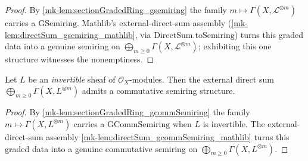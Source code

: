 \begin{proof}
  \leanok
  By \ref{mk-lem:sectionGradedRing_gsemiring} the family \(m \mapsto
  \Gamma(X,\mathcal{L}^{\otimes m})\) carries a \(\mathrm{GSemiring}\). Mathlib's
  external-direct-sum assembly (\ref{mk-lem:directSum_gsemiring_mathlib}, via
  \(\mathrm{DirectSum.toSemiring}\)) turns this graded data into a genuine semiring
  on \(\bigoplus_{m \ge 0} \Gamma(X,\mathcal{L}^{\otimes m})\); exhibiting this one
  structure witnesses the nonemptiness.
\end{proof}

\begin{lemma}\label{mk-lem:sectionGradedRing_commSemiring_nonempty}
  \leanok

  Let \(L\) be an \emph{invertible} sheaf of \(\mathcal{O}_X\)-modules. Then the
  external direct sum \(\bigoplus_{m \ge 0} \Gamma(X, L^{\otimes m})\) admits a
  commutative semiring structure.
\end{lemma}

\begin{proof}
  \leanok
  By \ref{mk-lem:sectionGradedRing_gcommSemiring} the family \(m \mapsto
  \Gamma(X, L^{\otimes m})\) carries a \(\mathrm{GCommSemiring}\) when \(L\) is
  invertible. The external-direct-sum assembly
  \ref{mk-lem:directSum_gcommSemiring_mathlib} turns this graded data into a genuine
  commutative semiring on \(\bigoplus_{m \ge 0} \Gamma(X, L^{\otimes m})\).
\end{proof}

